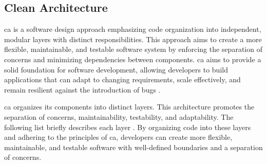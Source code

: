 \subsection{Clean Architecture}
\gls{ca} is a software design approach emphasizing code organization into independent,
modular layers with distinct responsibilities. This approach aims to create a more
flexible, maintainable, and testable software system by enforcing the separation of
concerns and minimizing dependencies between components. \gls{ca} aims to provide a solid
foundation for software development, allowing developers to build applications that can
adapt to changing requirements, scale effectively, and remain resilient against the
introduction of bugs \parencite{r_c_martin_clean_2018}.

\gls{ca} organizes its components into distinct layers. This architecture promotes the
separation of concerns, maintainability, testability, and adaptability. The following list
briefly describes each layer \parencite{r_c_martin_clean_2018}. By organizing code into
these layers and adhering to the principles of \gls{ca}, developers can create more
flexible, maintainable, and testable software with well-defined boundaries and a
separation of concerns.

